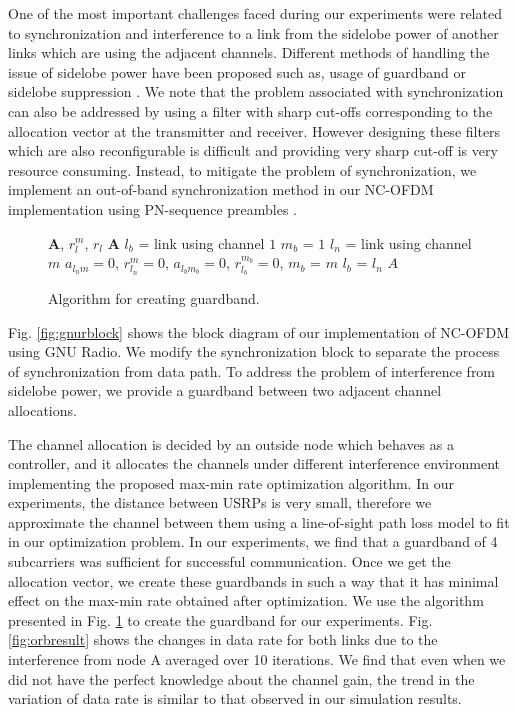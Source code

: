 \documentclass[conference]{IEEEtran}
\newenvironment{boxedalgorithmic}
  {\begin{lrbox}{\ieeealgbox}
   \begin{minipage}{\dimexpr\columnwidth-2\fboxsep-2\fboxrule}
   \begin{algorithmic}}
  {\end{algorithmic}
   \end{minipage}
   \end{lrbox}\noindent\fbox{\usebox{\ieeealgbox}}}
\begin{document}
One of the most important challenges faced during our experiments were related to synchronization and interference to a link from the sidelobe power of another links which are using the adjacent channels. Different methods of handling the issue of sidelobe power have been proposed such as, usage of guardband or sidelobe suppression \cite{dong2009,ghassemi2010,yuan2010}.  We note that the problem associated with synchronization  can also be addressed by using a filter with sharp cut-offs corresponding to the allocation vector at the transmitter and receiver. However designing these filters which are also reconfigurable is difficult and providing very sharp cut-off is very resource consuming. Instead,  to mitigate the  problem of synchronization, we implement an out-of-band synchronization method in our NC-OFDM implementation using PN-sequence preambles \cite{tufve99sync}.
\begin{figure}
\begin{boxedalgorithmic}[1]
 \renewcommand{\algorithmicrequire}{\textbf{Input:}}
 \renewcommand{\algorithmicensure}{\textbf{Output:}}
 \REQUIRE \textbf{A}, $r_l^m$, $r_{l}$
 \ENSURE  $\textbf{A}$
\STATE $l_b$ = link using channel $1$
  \STATE $m_b$ =  $1$
  \STATE $l_n$ = link using channel $m$
  \STATE $a_{{l_n}m}=0$,
  \STATE $r_{l_n}^m=0$,
  \ELSE
  \STATE $a_{{l_b}{m_b}}=0$,
  \STATE $r_{l_b}^{m_b}=0$,
  \ENDIF
  \ENDIF
  \STATE $m_b$ = $m$
  \STATE $l_b$ = $l_n$
  \ENDFOR
 \RETURN $A$ 
 \end{boxedalgorithmic} 
 \caption{Algorithm for creating guardband.}
 \label{fig:algogb}
\end{figure}
Fig. \ref{fig:gnurblock} shows the block diagram of our implementation of NC-OFDM using GNU Radio. We modify the synchronization block to separate the  process of synchronization from data path. To address the problem of interference from sidelobe power, we provide a guardband between two adjacent channel allocations. 


The channel allocation is decided by an outside node which behaves as a controller, and it allocates the channels under  different interference environment implementing the proposed  max-min rate optimization algorithm. In our experiments, the distance between USRPs is very small, therefore we approximate the channel between them using a line-of-sight path loss model to fit in our optimization problem. In our experiments, we find that a guardband of 4 subcarriers  was sufficient for successful communication. Once we get the allocation vector, we create these guardbands in such a way that it has minimal effect on the max-min rate obtained after optimization. We use  the algorithm presented in Fig. \ref{fig:algogb} to create the guardband for our experiments.  Fig. \ref{fig:orbresult} shows the changes in data rate for both links due to the  interference from node A averaged over 10 iterations. We find that even when we did not have the perfect knowledge about the channel gain, the trend in the variation of data rate is similar to that observed in our simulation results.
\end{document}
